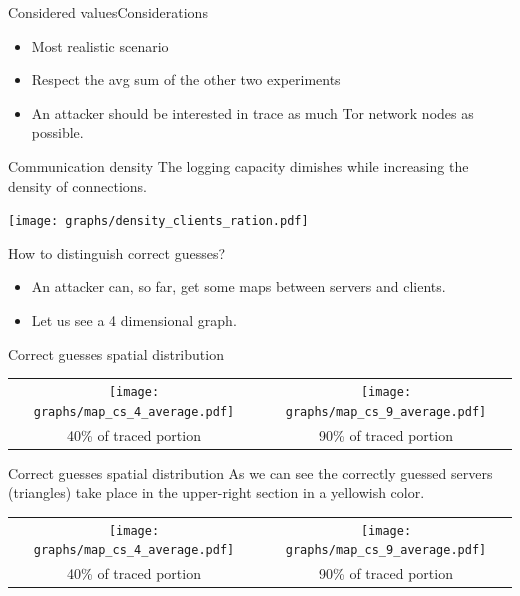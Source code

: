 	\begin{frame}{Considered values}{Considerations}
		\begin{itemize}
			\item Most realistic scenario
			\item Respect the avg sum of the other two experiments
			\item An attacker should be interested in trace as much Tor network nodes as possible.
		\end{itemize}
	\end{frame}

	\begin{frame}{Communication density}{}
		\small The logging capacity dimishes while increasing the density of
connections.
		\begin{center}
		\texttt{[image: graphs/density\_clients\_ration.pdf]}
		\end{center}
	\end{frame}

	\begin{frame}{How to distinguish correct guesses?}{}
		\begin{itemize}
			\item An attacker can, so far, get some maps between servers
			and clients.
			\item Let us see a 4 dimensional graph.
		\end{itemize}
	\end{frame}

	\begin{frame}{Correct guesses spatial distribution}{}
		\begin{minipage}{.9\textwidth}
			\begin{tabular}{c c}
				\texttt{[image: graphs/map\_cs\_4\_average.pdf]} &
				\texttt{[image: graphs/map\_cs\_9\_average.pdf]} \\
				\small 40\% of traced portion &
				\small 90\% of traced portion
			\end{tabular}
		\end{minipage}
	\end{frame}

	\begin{frame}{Correct guesses spatial distribution}{}
		\small As we can see the correctly guessed servers (triangles) take
place in the upper-right section in a yellowish color.
		\begin{minipage}{.9\textwidth}
			\begin{tabular}{c c}
				\texttt{[image: graphs/map\_cs\_4\_average.pdf]} &
				\texttt{[image: graphs/map\_cs\_9\_average.pdf]} \\
				\small 40\% of traced portion &
				\small 90\% of traced portion
			\end{tabular}
		\end{minipage}
	\end{frame}

